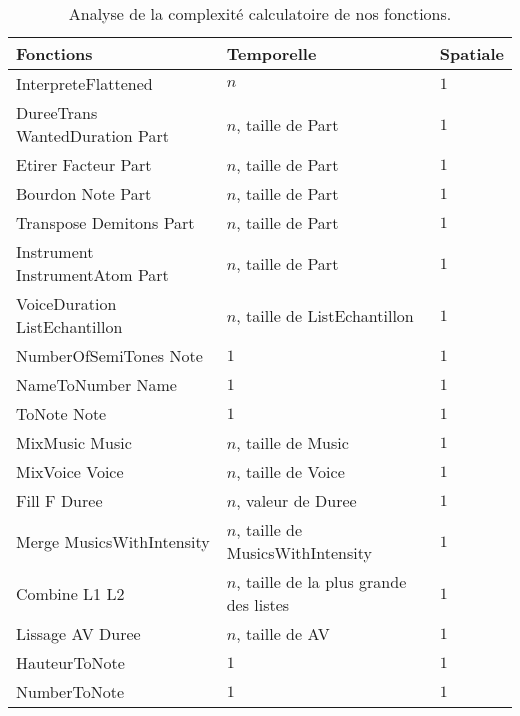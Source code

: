 \documentclass[12pt,a4paper]{article}
\begin{document}
	\begin{table}[ht!]
		\centering
			\begin{tabular}{|p{}|p{0.25\textwidth}|p{}|}
			\hline
			\textbf{Fonctions}																& \textbf{Temporelle}							& \textbf{Spatiale}	\\
			\hline
			InterpreteFlattened																& $n$ 														& $1$ \\
			\hline
			DureeTrans WantedDuration Part 										& $n$, taille de Part							& $1$ \\
			\hline 
			Etirer Facteur Part																& $n$, taille de Part 						& $1$ \\
			\hline
			Bourdon Note Part																	& $n$, taille de Part 						& $1$ \\
			\hline
			Transpose Demitons Part														& $n$, taille de Part 						& $1$ \\
			\hline
			Instrument InstrumentAtom Part										& $n$, taille de Part							& $1$ \\
			\hline
			VoiceDuration ListEchantillon											& $n$, taille de ListEchantillon	& $1$ \\
			\hline
			NumberOfSemiTones Note														& $1$ 														& $1$ \\
			\hline
			NameToNumber Name																	& $1$ 														& $1$ \\
			\hline
			ToNote Note																				& $1$ 														& $1$ \\ 
			\hline
			\hline
			MixMusic Music																		& $n$, taille de Music						& $1$ \\
			\hline
			MixVoice Voice																		& $n$, taille de Voice						& $1$ \\
			\hline
			Fill F Duree																			& $n$, valeur de Duree						& $1$ \\
			\hline
			Merge MusicsWithIntensity													& $n$, taille de MusicsWithIntensity	& $1$ \\
			\hline
			Combine L1 L2																			& $n$, taille de la plus grande des listes	& $1$ \\
			\hline
			Lissage AV Duree																	& $n$, taille de AV								& $1$ \\
			\hline
			HauteurToNote																			& $1$ 														& $1$ \\
			\hline
			NumberToNote																			& $1$ 														& $1$ \\
			\hline
			\end{tabular}
		\caption{Analyse de la complexité calculatoire de nos fonctions.}
	\end{table}
\end{document}
